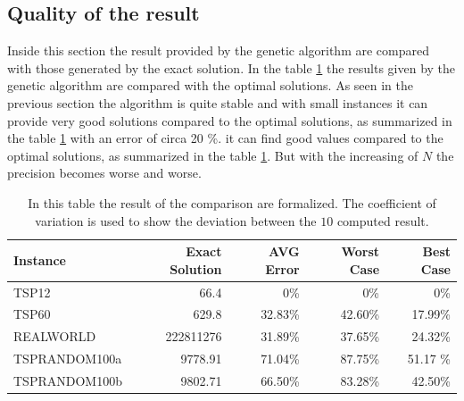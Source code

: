 \subsection{Quality of the result}
Inside this section the result provided by the genetic algorithm are compared with
those generated by the exact solution.
In the table \ref{table:quality}  the results given by the genetic algorithm are compared
with the optimal solutions.
As seen in the previous section the algorithm is quite stable and with small instances
it can provide very good solutions compared to the optimal solutions, as summarized in the table
\ref{table:quality} with an error of circa 20 \%.
it can find
good values compared to the optimal solutions, as summarized in the table \ref{table:quality}.
But with the increasing of $N$ the precision becomes worse and worse.
\begin{table}
	\centering
\begin{tabular}{|l|r|r|r|r|}
	\hline
	Instance 	& Exact Solution & AVG Error &  Worst Case & Best Case  \\
	\hline
	TSP12 		&  	66.4		   &  0\%	   		&	0\%	     	&     0\%   \\
	TSP60 		&  	629.8		   &  	32.83\%     &	42.60\%		&    17.99\% \\
	REALWORLD 	&   222811276      & 	31.89\%   	&	37.65\%   	&   24.32\% 	    \\
	TSPRANDOM100a & 9778.91        & 71.04\% 		& 	87.75\% 	& 51.17 \% \\
	TSPRANDOM100b & 9802.71        & 66.50\% 		&	83.28\% 	& 42.50\% \\
	\hline
\end{tabular}
\caption{In this table the result of the comparison are formalized. The coefficient of variation is used to show
	the deviation between the $10$ computed result.}
\label{table:quality}
\end{table}
